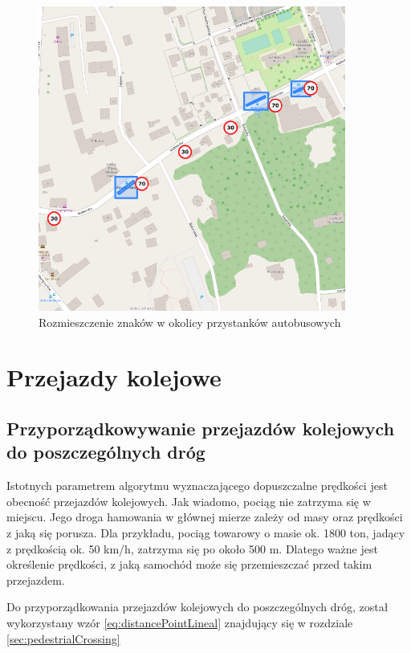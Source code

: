 \begin{figure}[h]
\caption{Rozmieszczenie znaków w okolicy przystanków autobusowych}
\label{sec:busStopSpeed}
\centering
\includegraphics[width=0.9\textwidth]{busStopSpeed}
\end{figure}

\newpage
\section{Przejazdy kolejowe}
\label{sec:railCrossingMain}
\subsection{Przyporządkowywanie przejazdów kolejowych do poszczególnych dróg}

Istotnych parametrem algorytmu wyznaczającego dopuszczalne prędkości jest obecność przejazdów kolejowych. Jak wiadomo, pociąg nie zatrzyma się w miejscu. Jego droga hamowania w głównej mierze zależy od masy oraz prędkości z jaką się porusza. Dla przykładu, pociąg towarowy o masie ok. 1800 ton, jadący z prędkością ok. 50 km/h, zatrzyma się po około 500 m. Dlatego ważne jest określenie prędkości, z jaką samochód może się przemieszczać przed takim przejazdem.

Do przyporządkowania przejazdów kolejowych do poszczególnych dróg, został wykorzystany wzór \ref{eq:distancePointLineal} znajdujący się w rozdziale \ref{sec:pedestrialCrossing}



